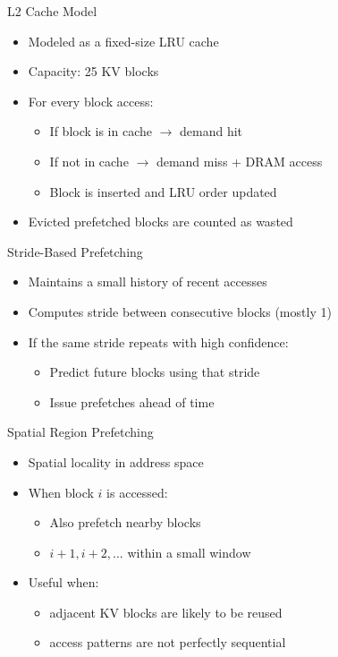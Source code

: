\documentclass[Serif, 10pt, brown]{beamer}
\theoremstyle{example}
\theoremstyle{plain}
\begin{document}
\begin{frame}{L2 Cache Model}
    \begin{itemize}
        \item Modeled as a fixed-size LRU cache
        \item Capacity: 25 KV blocks
        \item For every block access:
        \begin{itemize}
            \item If block is in cache $\rightarrow$ demand hit
            \item If not in cache $\rightarrow$ demand miss + DRAM access
            \item Block is inserted and LRU order updated
        \end{itemize}
        \item Evicted prefetched blocks are counted as wasted
    \end{itemize}
\end{frame}

\begin{frame}{Stride-Based Prefetching}
    \begin{itemize}
        \item Maintains a small history of recent accesses
        \item Computes stride between consecutive blocks (mostly 1)
        \item If the same stride repeats with high confidence:
        \begin{itemize}
            \item Predict future blocks using that stride
            \item Issue prefetches ahead of time
        \end{itemize}
    \end{itemize}
\end{frame}

\begin{frame}{Spatial Region Prefetching}
    \begin{itemize}
        \item Spatial locality in address space
        \item When block $i$ is accessed:
        \begin{itemize}
            \item Also prefetch nearby blocks
            \item $i+1, i+2, ...$ within a small window
        \end{itemize}
        \item Useful when:
        \begin{itemize}
            \item adjacent KV blocks are likely to be reused
            \item access patterns are not perfectly sequential
        \end{itemize}
    \end{itemize}
\end{frame}
\end{document}
